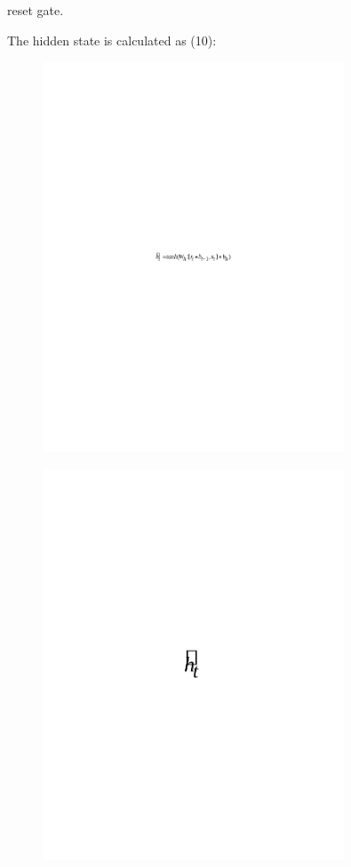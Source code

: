 reset gate.

The hidden state is calculated as (10):

\begin{figure}[H]
	\centering
	\includegraphics[width=0.8\textwidth]{media/ict/image71}
	\caption*{}
\end{figure}


\begin{figure}[H]
	\centering
	\includegraphics[width=0.8\textwidth]{media/ict/image72}
	\caption*{}
\end{figure}

